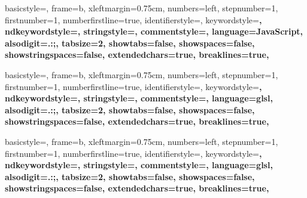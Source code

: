 
 {%
  basicstyle={\footnotesize\ttfamily},
  frame=b,
  xleftmargin={0.75cm},
  numbers=left,
  stepnumber=1,
  firstnumber=1,
  numberfirstline=true,
  identifierstyle=\color{black},
  keywordstyle=\color{blue}\bfseries,
  ndkeywordstyle=\color{editorGreen}\bfseries,
  stringstyle=\color{editorOcher}\ttfamily,
  commentstyle=\color{brown}\ttfamily,
  language=JavaScript,
  alsodigit={.:;},
  tabsize=2,
  showtabs=false,
  showspaces=false,
  showstringspaces=false,
  extendedchars=true,
  breaklines=true,
}

 {%
  basicstyle={\footnotesize\ttfamily},
  frame=b,
  xleftmargin={0.75cm},
  numbers=left,
  stepnumber=1,
  firstnumber=1,
  numberfirstline=true,
  identifierstyle=\color{black},
  keywordstyle=\color{blue}\bfseries,
  ndkeywordstyle=\color{editorGreen}\bfseries,
  stringstyle=\color{editorOcher}\ttfamily,
  commentstyle=\color{brown}\ttfamily,
  language=glsl,
  alsodigit={.:;},
  tabsize=2,
  showtabs=false,
  showspaces=false,
  showstringspaces=false,
  extendedchars=true,
  breaklines=true,
}

 {%
  basicstyle={\footnotesize\ttfamily},
  frame=b,
  xleftmargin={0.75cm},
  numbers=left,
  stepnumber=1,
  firstnumber=1,
  numberfirstline=true,
  identifierstyle=\color{black},
  keywordstyle=\color{blue}\bfseries,
  ndkeywordstyle=\color{editorGreen}\bfseries,
  stringstyle=\color{editorOcher}\ttfamily,
  commentstyle=\color{brown}\ttfamily,
  language=glsl,
  alsodigit={.:;},
  tabsize=2,
  showtabs=false,
  showspaces=false,
  showstringspaces=false,
  extendedchars=true,
  breaklines=true,
}


